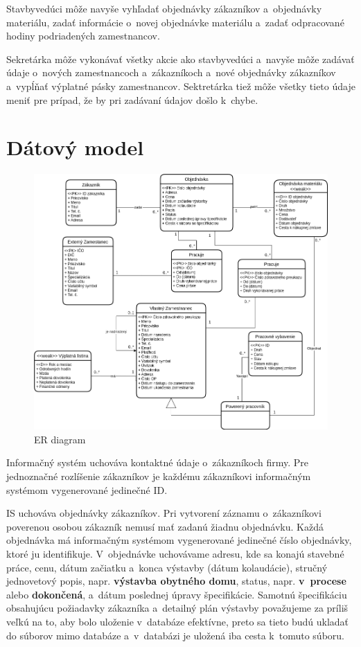 \documentclass[a4paper]{article}
\begin{document}
Stavbyvedúci môže navyše vyhľadať objednávky zákazníkov a~objednávky materiálu, zadať informácie o~novej objednávke materiálu a~zadať odpracované hodiny podriadených zamestnancov.

Sekretárka môže vykonávať všetky akcie ako stavbyvedúci a~navyše môže zadávať údaje o~nových zamestnancoch a~zákazníkoch a~nové objednávky zákazníkov a~vypĺňať výplatné pásky zamestnancov.
Sektretárka tiež môže všetky tieto údaje meniť pre prípad, že by pri zadávaní údajov došlo k~chybe.

\section{Dátový model}

\begin{figure}[H]
    \centering
    \includegraphics[width=\linewidth,height=0.7\textheight,keepaspectratio]{StavebnaFirma.png}
    \caption{ER diagram}
\end{figure}

Informačný systém uchováva kontaktné údaje o~zákazníkoch firmy.
Pre jednoznačné rozlíšenie zákazníkov je každému zákazníkovi informačným systémom vygenerované jedinečné ID.\@

IS uchováva objednávky zákazníkov.
Pri vytvorení záznamu o~zákazníkovi poverenou osobou zákazník nemusí mať zadanú žiadnu objednávku.
Každá objednávka má informačným systémom vygenerované jedinečné číslo objednávky, ktoré ju identifikuje.
V~objednávke uchovávame adresu, kde sa konajú stavebné práce, cenu, dátum začiatku a~konca výstavby (dátum kolaudácie), stručný jednovetový popis, napr. \textbf{výstavba obytného domu}, status, napr. \textbf{v~procese} alebo \textbf{dokončená}, a~dátum poslednej úpravy špecifikácie.
Samotnú špecifikáciu obsahujúcu požiadavky zákazníka a~detailný plán výstavby považujeme za príliš veľkú na to, aby bolo uloženie v~databáze efektívne, preto sa tieto budú ukladať do súborov mimo databáze a~v~databázi je uložená iba  cesta k~tomuto súboru.\@
\end{document}
